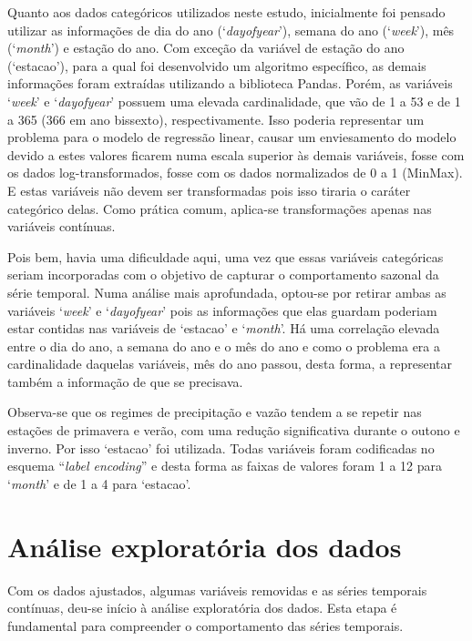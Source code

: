 Quanto aos dados categóricos utilizados neste estudo, inicialmente foi pensado utilizar as informações de dia do ano (`\textit{dayofyear}'), semana do ano (`\textit{week}'), mês (`\textit{month}') e estação do ano. Com exceção da variável de estação do ano (`estacao'), para a qual foi desenvolvido um algoritmo específico, as demais informações foram extraídas utilizando a biblioteca Pandas.\cite{mckinney2011pandas} Porém, as variáveis `\textit{week}' e `\textit{dayofyear}' possuem uma elevada cardinalidade, que vão de 1 a 53 e de 1 a 365 (366 em ano bissexto), respectivamente. Isso poderia representar um problema para o modelo de regressão linear, causar um enviesamento do modelo devido a estes valores ficarem numa escala superior às demais variáveis, fosse com os dados log-transformados, fosse com os dados normalizados de 0 a 1 (MinMax). E estas variáveis não devem ser transformadas pois isso tiraria o caráter categórico delas. Como prática comum, aplica-se transformações apenas nas variáveis contínuas.

Pois bem, havia uma dificuldade aqui, uma vez que essas variáveis categóricas seriam incorporadas com o objetivo de capturar o comportamento sazonal da série temporal. Numa análise mais aprofundada, optou-se por retirar ambas as variáveis `\textit{week}' e `\textit{dayofyear}' pois as informações que elas guardam poderiam estar contidas nas variáveis de `estacao' e `\textit{month}'. Há uma correlação elevada entre o dia do ano, a semana do ano e o mês do ano e como o problema era a cardinalidade daquelas variáveis, mês do ano passou, desta forma, a representar também a informação de que se precisava.

Observa-se que os regimes de precipitação e vazão tendem a se repetir nas estações de primavera e verão, com uma redução significativa durante o outono e inverno. Por isso `estacao' foi utilizada. Todas variáveis foram codificadas no esquema ``\textit{label encoding}'' e desta forma as faixas de valores foram 1 a 12 para `\textit{month}' e de 1 a 4 para `estacao'.

\section{Análise exploratória dos dados}

Com os dados ajustados, algumas variáveis removidas e as séries temporais contínuas, deu-se início à análise exploratória dos dados. Esta etapa é fundamental para compreender o comportamento das séries temporais.

